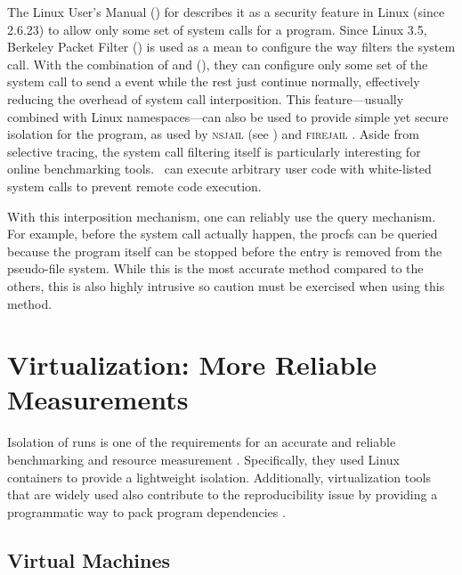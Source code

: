 The Linux User's Manual (\citeyear{manpages}) for  describes it as a security feature in Linux (since 2.6.23) to allow only some set of system calls for a program.
Since Linux 3.5, Berkeley Packet Filter () is used as a mean to configure the way  filters the system call.
With the combination of  and  (), they can configure only some set of the system call to send a  event while the rest just continue normally, effectively reducing the overhead of system call interposition.
This feature---usually combined with Linux namespaces---can also be used to provide simple yet secure isolation for the program, as used by \textsc{nsjail} (see ) and \textsc{firejail} \citep{netblue30LinuxNamespacesSeccompbpf2019}.
Aside from selective tracing, the system call filtering itself is particularly interesting for online benchmarking tools.
\First~can execute arbitrary user code with white-listed system calls to prevent remote code execution.

With this interposition mechanism, one can reliably use the query mechanism.
For example, before the  system call actually happen, the procfs can be queried because the program itself can be stopped before the entry is removed from the pseudo-file system.
While this is the most accurate method compared to the others, this is also highly intrusive so caution must be exercised when using this method.

\section{Virtualization: More Reliable Measurements}
\label{sec:resource.virtualization}

Isolation of runs is one of the requirements for an accurate and reliable benchmarking and resource measurement \citep{beyerReliableBenchmarkingRequirements2019}.
Specifically, they used Linux containers to provide a lightweight isolation.
Additionally, virtualization tools that are widely used also contribute to the reproducibility issue by providing a programmatic way to pack program dependencies \citep{boettigerIntroductionDockerReproducible2015,kordonBenchKitToolMassive2014}.

\subsection{Virtual Machines}

